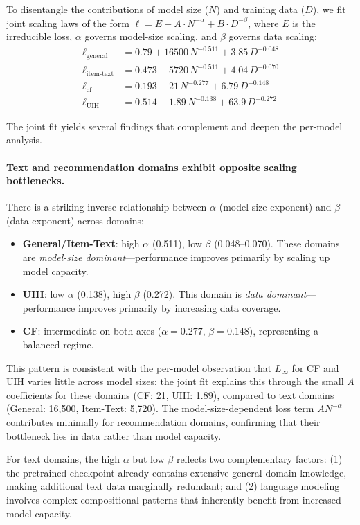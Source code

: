 \documentclass[]{fairmeta}
\begin{document}
  To disentangle the contributions of model size ($N$) and training data ($D$), we fit joint scaling laws of the form $\ell = E + A \cdot N^{-\alpha} + B \cdot D^{-\beta}$, where $E$ is the irreducible loss, $\alpha$ governs model-size scaling, and $\beta$ governs data scaling:
  \begin{align}
      \ell_{\text{general}} &= 0.79 + 16500\, N^{-0.511} + 3.85\, D^{-0.048} \\
      \ell_{\text{item-text}} &= 0.473 + 5720\, N^{-0.511} + 4.04\, D^{-0.070} \\
      \ell_{\text{cf}} &= 0.193 + 21\, N^{-0.277} + 6.79\, D^{-0.148} \\
      \ell_{\text{UIH}} &= 0.514 + 1.89\, N^{-0.138} + 63.9\, D^{-0.272}
  \end{align}

  The joint fit yields several findings that complement and deepen the per-model analysis.

  \paragraph{Text and recommendation domains exhibit opposite scaling bottlenecks.}
  There is a striking inverse relationship between $\alpha$ (model-size exponent) and $\beta$ (data exponent) across domains:
  \begin{itemize}
      \item \textbf{General/Item-Text}: high $\alpha$ (0.511), low $\beta$ (0.048--0.070). These domains are \emph{model-size dominant}—performance improves primarily by scaling up model capacity.
      \item \textbf{UIH}: low $\alpha$ (0.138), high $\beta$ (0.272). This domain is \emph{data dominant}—performance improves primarily by increasing data coverage.
      \item \textbf{CF}: intermediate on both axes ($\alpha = 0.277$, $\beta = 0.148$), representing a balanced regime.
  \end{itemize}
  This pattern is consistent with the per-model observation that $L_\infty$ for CF and UIH varies little across model sizes: the joint fit explains this through the small $A$ coefficients for these domains (CF: 21, UIH: 1.89), compared to text domains (General: 16{,}500, Item-Text: 5{,}720).
  The model-size-dependent loss term $A N^{-\alpha}$ contributes minimally for recommendation domains, confirming that their bottleneck lies in data rather than model capacity.

  For text domains, the high $\alpha$ but low $\beta$ reflects two complementary factors: (1) the pretrained checkpoint already contains extensive general-domain knowledge, making additional text data marginally redundant; and (2) language modeling involves complex compositional patterns that
   inherently benefit from increased model capacity.
\end{document}
